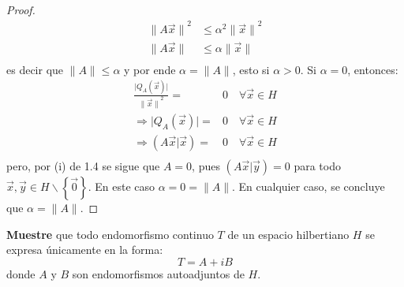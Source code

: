 \documentclass[12pt]{report}
\newcounter{it}
\theoremstyle{largebreak}
\newcommand\abs[1]{\ensuremath{\big|#1\big|}}
\newcommand\pint[2]{\ensuremath{\left(#1\big|#2\right)}}
\newcommand\norm[1]{\ensuremath{\|#1\|}}
\begin{document}
\begin{proof}
        \begin{equation*}
            \begin{split}
                \norm{A\vec{x}}^2&\leq\alpha^2\norm{\vec{x}}^2 \\
                \norm{A\vec{x}}&\leq\alpha\norm{\vec{x}}\\
            \end{split}
        \end{equation*}
        es decir que $\norm{A}\leq\alpha$ y por ende $\alpha=\norm{A}$, esto si $\alpha>0$. Si $\alpha=0$, entonces:
        \begin{equation*}
            \begin{split}
                \frac{\abs{Q_A(\vec{x})}}{\norm{\vec{x}}^2}=&0\quad\forall\vec{x}\in H\\
                \Rightarrow \abs{Q_A(\vec{x})}=&0\quad\forall\vec{x}\in H\\
                \Rightarrow \pint{A\vec{x}}{\vec{x}}=&0\quad\forall\vec{x}\in H\\
            \end{split}
        \end{equation*}
        pero, por (i) de 1.4 se sigue que $A=0$, pues $\pint{A\vec{x}}{\vec{y}}=0$ para todo $\vec{x},\vec{y}\in H\backslash\left\{\vec{0} \right\}$. En este caso $\alpha=0=\norm{A}$. En cualquier caso, se concluye que $\alpha=\norm{A}$.
    \end{proof}

    \begin{excer}
        \textbf{Muestre} que todo endomorfismo continuo $T$ de un espacio hilbertiano $H$ se expresa únicamente en la forma:
        \begin{equation*}
            T=A+iB
        \end{equation*}
        donde $A$ y $B$ son endomorfismos autoadjuntos de $H$.
    \end{excer}
\end{document}
